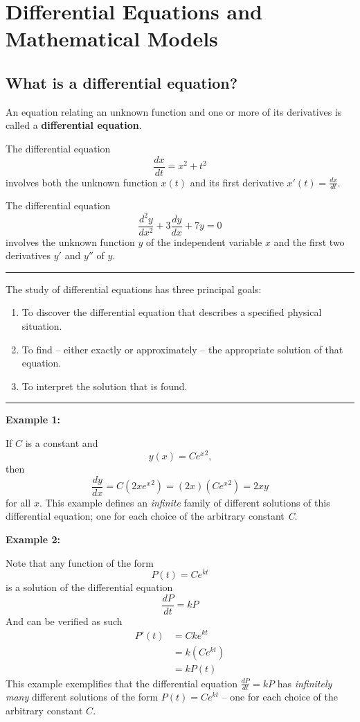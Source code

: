 \documentclass{article}
\begin{document}
\newpage
    \tableofcontents
\newpage

\section{Differential Equations and Mathematical Models}

\subsection{What is a differential equation?}

An equation relating an unknown function and one or more of its derivatives is called a \textbf{differential equation}.

The differential equation
$$ \frac{dx}{dt} = x^2 + t^2 $$
involves both the unknown function $ x(t) $ and its first derivative $ x'(t) = \frac{dx}{dt} $.

The differential equation
$$ \frac{d^2y}{dx^2} + 3\frac{dy}{dx} + 7y = 0 $$
involves the unknown function $ y $ of the independent variable $ x $ and the first two derivatives $ y' $ and $ y'' $ of $ y $.

\par\noindent\rule{\textwidth}{0.4pt}

The study of differential equations has three principal goals:
\begin{enumerate}
    \item To discover the differential equation that describes a specified physical situation.
    \item To find – either exactly or approximately – the appropriate solution of that equation.
    \item To interpret the solution that is found.
\end{enumerate}

\par\noindent\rule{\textwidth}{0.4pt}

\textbf{Example 1:}

If $ C $ is a constant and
$$ y(x) = C{e^x}^{2}\text{,} $$
then
$$ \frac{dy}{dx} = C\left(2x{e^x}^{2}\right) = (2x)\left(C{e^x}^{2}\right) = 2xy $$
for all $ x $. This example defines an \textit{infinite} family of different solutions of this differential equation; one for each choice of the arbitrary constant \textit{C}.

\textbf{Example 2:}

Note that any function of the form
$$ P(t) = Ce^{kt} $$
is a solution of the differential equation
$$ \frac{dP}{dt} = kP $$
And can be verified as such
\begin{align*}
    P'(t) & = Cke^{kt} \\
          & = k\left(Ce^{kt}\right) \\
          & = kP(t)
\end{align*}
This example exemplifies that the differential equation $ \frac{dP}{dt} = kP $ has \textit{infinitely many} different solutions of the form $ P(t) = Ce^{kt} $ – one for each choice of the arbitrary constant $ C $.
\end{document}
